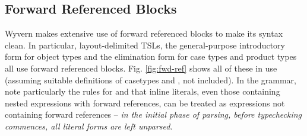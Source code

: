 \subsection{Forward Referenced Blocks}
Wyvern makes extensive use of forward referenced blocks to make its syntax clean. In particular, layout-delimited TSLs, the general-purpose introductory form for object types and the elimination form for case types and product types all use forward referenced blocks. Fig. \ref{fig:fwd-ref} shows all of these in use (assuming suitable definitions of casetypes  and , not included). In the grammar, note particularly the rules for  and that inline literals, even those containing nested expressions with forward references, can be treated as expressions not containing forward references -- \emph{in the initial phase of parsing, before typechecking commences, all literal forms are left unparsed}.

